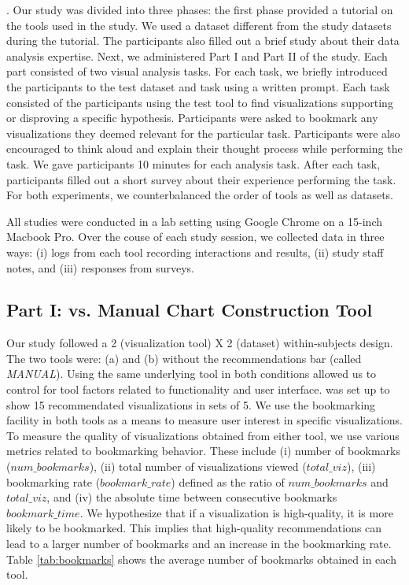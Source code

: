  .
 Our study was divided into three phases: the first
 phase provided a tutorial on the tools used 
 in the study. 
 We used a dataset different from the study datasets during the tutorial.
 The participants also filled out a brief study about their data analysis 
 expertise.
 Next, we administered Part I and Part II of the study.
 Each part consisted of two visual analysis tasks.
 For each task, we briefly introduced the participants to the test dataset
 and task using a written prompt.
 Each task consisted of the participants using the test tool to find visualizations 
 supporting or disproving a specific hypothesis.
 Participants were asked to bookmark any visualizations they deemed relevant for the
 particular task.
 Participants were also encouraged to think aloud and explain their thought process
 while performing the task.
 We gave participants 10 minutes for each analysis task.
 After each task, participants filled out a short survey about their experience
 performing the task.
 For both experiments, we counterbalanced the order of tools as well as datasets.

 All studies were conducted in a lab setting using Google Chrome on a 15-inch 
 Macbook Pro.
 Over the couse of each study session, we collected data in three ways: (i) logs 
 from each tool recording interactions and results, (ii) study staff notes, and (iii) responses from surveys.



\subsection{Part I: \SeeDB vs. Manual Chart Construction Tool}
Our study followed a 2 (visualization tool) X 2 (dataset) within-subjects
design.
The two tools were: (a) \SeeDB and (b) \SeeDB without the recommendations
bar (called {\em MANUAL}).
Using the same underlying tool in both conditions allowed us to control for
tool factors related to functionality and user interface.
\SeeDB was set up to show 15 recommendated visualizations in sets of 5.
We use the bookmarking facility in both tools as a means to measure user 
interest in specific visualizations.
To measure the quality of visualizations obtained from either tool, we use
various metrics related to bookmarking behavior.
These include (i) number of bookmarks ($num\_bookmarks$), (ii) total number of visualizations
viewed ($total\_viz$), (iii) bookmarking rate ($bookmark\_rate$) defined as the ratio
of $num\_bookmarks$ and $total\_viz$, and (iv) the absolute time between consecutive
bookmarks $bookmark\_time$.
We hypothesize that if a visualization is high-quality, it is more likely to be bookmarked.
This implies that high-quality recommendations can lead to a larger number of bookmarks and
an increase in the bookmarking rate.
Table \ref{tab:bookmarks} shows the average number of bookmarks obtained in each tool.

